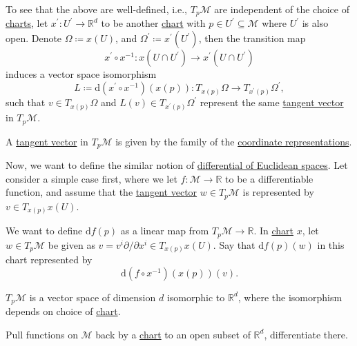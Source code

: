 To see that the above are well-defined, i.e., \(T_p \mathcal{M} \) are independent of the choice of \hyperref[def:coordinate-chart]{charts}, let \(x^\prime \colon U^\prime \to \mathbb{R} ^d\) to be another \hyperref[def:coordinate-chart]{chart} with \(p\in U^\prime \subseteq \mathcal{M} \) where \(U^\prime \) is also open. Denote \(\Omega \coloneqq x(U)\), and \(\Omega ^\prime \coloneqq x^\prime (U^\prime )\), then the transition map
\[
	x^\prime \circ x^{-1} \colon x(U \cap U^\prime )\to x^\prime (U \cap U^\prime )
\]
induces a vector space isomorphism
\[
	L\coloneqq \mathrm{d} (x^\prime \circ x ^{-1} )(x(p)) \colon T_{x(p)}\Omega \to T_{x^\prime (p)}\Omega ^\prime,
\]
such that \(v\in T_{x(p)}\Omega \) and \(L(v)\in T_{x^\prime (p)}\Omega ^\prime \) represent the same \hyperref[def:tangent-vector]{tangent vector} in \(T_p \mathcal{M} \).

\begin{remark}
	A \hyperref[def:tangent-vector]{tangent vector} in \(T_p \mathcal{M} \) is given by the family of the \hyperref[def:coordinate-chart]{coordinate representations}.
\end{remark}

Now, we want to define the similar notion of \hyperref[def:differential-of-Euclidean-space]{differential of Euclidean spaces}. Let consider a simple case first, where we let \(f\colon \mathcal{M} \to \mathbb{R} \) to be a differentiable function, and assume that the \hyperref[def:tangent-vector]{tangent vector} \(w\in T_p \mathcal{M} \) is represented by \(v\in T_{x(p)}x(U)\).

\begin{intuition}
	We want to define \(\mathrm{d} f(p)\) as a linear map from \(T_p \mathcal{M} \to \mathbb{R} \). In \hyperref[def:coordinate-chart]{chart} \(x\), let \(w\in T_p \mathcal{M} \) be given as \(v = v^i \partial /\partial x^i\in T_{x(p)}x(U)\). Say that \(\mathrm{d} f(p)(w)\) in this chart represented by
	\[
		\mathrm{d} (f \circ x ^{-1} )(x(p)) (v).
	\]
	\begin{center}
	\end{center}
\end{intuition}

\begin{remark}
	\(T_p \mathcal{M} \) is a vector space of dimension \(d\) isomorphic to \(\mathbb{R} ^d\), where the isomorphism depends on choice of \hyperref[def:coordinate-chart]{chart}.
\end{remark}

\begin{intuition}
	Pull functions on \(\mathcal{M} \) back by a \hyperref[def:coordinate-chart]{chart} to an open subset of \(\mathbb{R} ^d\), differentiate there.
\end{intuition}

